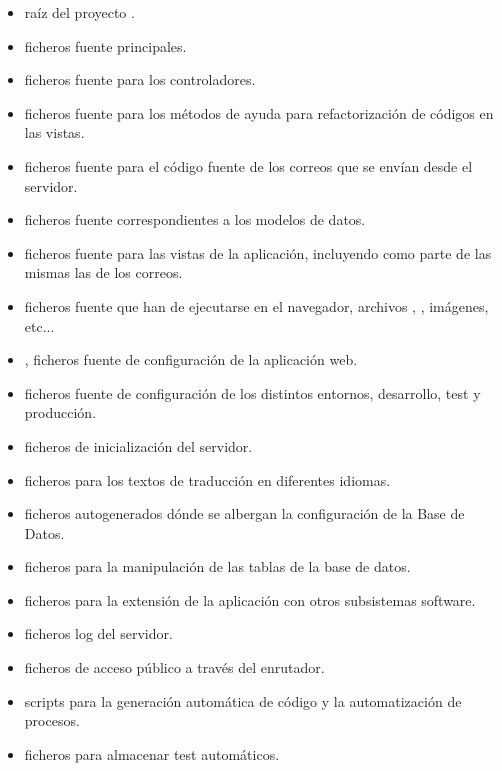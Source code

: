 \begin{itemize}
\item {} raíz del proyecto .
\item {} ficheros fuente principales.
\item {} ficheros fuente para los
  controladores.
\item {} ficheros fuente para los métodos de ayuda
  para refactorización de códigos en las vistas.
\item {} ficheros fuente para el código fuente de
  los correos que se envían desde el servidor.
\item {} ficheros fuente correspondientes a los
  modelos de datos.
\item {} ficheros fuente para las vistas de la
  aplicación, incluyendo como parte de las mismas las de los correos.
\item {} ficheros fuente que han de ejecutarse en
  el navegador, archivos , , imágenes, etc...
\item {}, ficheros fuente de configuración de la
  aplicación web.
\item {} ficheros fuente de configuración
  de los distintos entornos, desarrollo, test y producción.
\item {} ficheros de inicialización del
  servidor.
\item {} ficheros  para los
  textos de traducción en diferentes idiomas.
\item {} ficheros autogenerados dónde se albergan la
  configuración de la Base de Datos.
\item {} ficheros para la manipulación de las
  tablas de la base de datos.
\item {} ficheros para la extensión de la aplicación con
  otros subsistemas software.
\item {} ficheros log del servidor.
\item {} ficheros de acceso público a través del
  enrutador.
\item {} scripts para la generación automática de
  código y la automatización de procesos.
\item {} ficheros para almacenar test automáticos.
\end{itemize}

